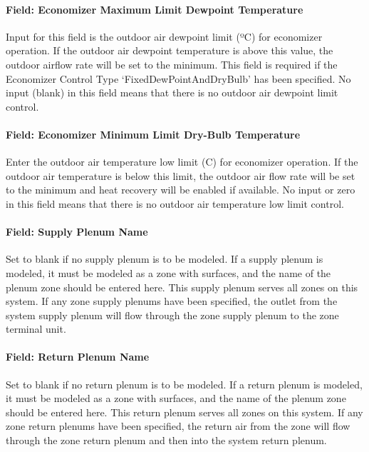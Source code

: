\paragraph{Field: Economizer Maximum Limit Dewpoint Temperature}\label{field-economizer-maximum-limit-dewpoint-temperature-2}

Input for this field is the outdoor air dewpoint limit (ºC) for economizer operation. If the outdoor air dewpoint temperature is above this value, the outdoor airflow rate will be set to the minimum. This field is required if the Economizer Control Type `FixedDewPointAndDryBulb' has been specified. No input (blank) in this field means that there is no outdoor air dewpoint limit control.

\paragraph{Field: Economizer Minimum Limit Dry-Bulb Temperature}\label{field-economizer-minimum-limit-dry-bulb-temperature-1}

Enter the outdoor air temperature low limit (C) for economizer operation. If the outdoor air temperature is below this limit, the outdoor air flow rate will be set to the minimum and heat recovery will be enabled if available. No input or zero in this field means that there is no outdoor air temperature low limit control.

\paragraph{Field: Supply Plenum Name}\label{field-supply-plenum-name-7}

Set to blank if no supply plenum is to be modeled. If a supply plenum is modeled, it must be modeled as a zone with surfaces, and the name of the plenum zone should be entered here. This supply plenum serves all zones on this system. If any zone supply plenums have been specified, the outlet from the system supply plenum will flow through the zone supply plenum to the zone terminal unit.

\paragraph{Field: Return Plenum Name}\label{field-return-plenum-name-8}

Set to blank if no return plenum is to be modeled. If a return plenum is modeled, it must be modeled as a zone with surfaces, and the name of the plenum zone should be entered here. This return plenum serves all zones on this system. If any zone return plenums have been specified, the return air from the zone will flow through the zone return plenum and then into the system return plenum.

